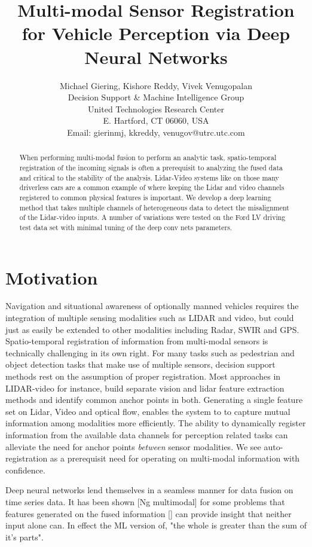 \documentclass{article}
\title{Multi-modal Sensor Registration for Vehicle Perception via Deep Neural Networks}
\author{Michael Giering, Kishore Reddy, Vivek Venugopalan\\
Decision Support \& Machine Intelligence Group \\
United Technologies Research Center\\
E. Hartford, CT 06060, USA \\
Email: {gierinmj, kkreddy, venugov}@utrc.utc.com}
\begin{document}
\maketitle

\begin{abstract}
When performing multi-modal fusion to perform an analytic task, spatio-temporal registration of the incoming signals is often a prerequisit to analyzing the fused data and critical to the stability of the analysis. Lidar-Video systems like on those many driverless cars are a common example of where keeping the Lidar and video channels registered to common physical features is important. We develop a deep learning method that takes multiple channels of heterogeneous data to detect the misalignment of the Lidar-video inputs. A number of variations were tested on the Ford LV driving test data set with minimal tuning of the deep conv nets parameters. 

\end{abstract}

\section{Motivation}
Navigation and situational awareness of optionally manned vehicles requires the integration of multiple sensing modalities such as LIDAR and video, but could just as easily be extended to other modalities including Radar, SWIR and GPS. Spatio-temporal registration of information from multi-modal sensors is technically challenging in its own right. For many tasks such as pedestrian and object detection tasks that make use of multiple sensors, decision support methods rest on the assumption of proper registration. Most approaches \cite{Bodensteiner2012Real-time-} in LIDAR-video for instance, build separate vision and lidar feature extraction methods and identify common anchor points in both. Generating a single feature set on Lidar, Video and optical flow, enables the system to to capture mutual information among modalities more efficiently. The ability to dynamically register information from the available data channels for perception related tasks can alleviate the need for anchor points \emph{between} sensor modalities. We see auto-registration as a prerequisit need for operating on multi-modal information with confidence.

Deep neural networks lend themselves in a seamless manner for data fusion on time series data. It has been shown [Ng multimodal] for some problems that features generated on the fused information [] can provide insight that neither input alone can. In effect the ML version of, "the whole is greater than the sum of it's parts". 
\end{document}
